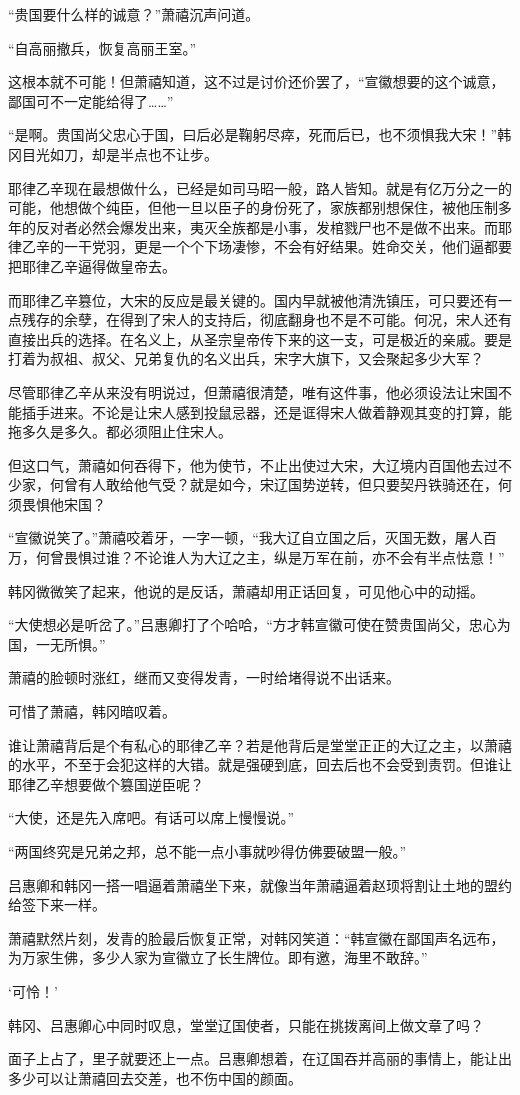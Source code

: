 “贵国要什么样的诚意？”萧禧沉声问道。

“自高丽撤兵，恢复高丽王室。”

这根本就不可能！但萧禧知道，这不过是讨价还价罢了，“宣徽想要的这个诚意，鄙国可不一定能给得了……”

“是啊。贵国尚父忠心于国，曰后必是鞠躬尽瘁，死而后已，也不须惧我大宋！”韩冈目光如刀，却是半点也不让步。

耶律乙辛现在最想做什么，已经是如司马昭一般，路人皆知。就是有亿万分之一的可能，他想做个纯臣，但他一旦以臣子的身份死了，家族都别想保住，被他压制多年的反对者必然会爆发出来，夷灭全族都是小事，发棺戮尸也不是做不出来。而耶律乙辛的一干党羽，更是一个个下场凄惨，不会有好结果。姓命交关，他们逼都要把耶律乙辛逼得做皇帝去。

而耶律乙辛篡位，大宋的反应是最关键的。国内早就被他清洗镇压，可只要还有一点残存的余孽，在得到了宋人的支持后，彻底翻身也不是不可能。何况，宋人还有直接出兵的选择。在名义上，从圣宗皇帝传下来的这一支，可是极近的亲戚。要是打着为叔祖、叔父、兄弟复仇的名义出兵，宋字大旗下，又会聚起多少大军？

尽管耶律乙辛从来没有明说过，但萧禧很清楚，唯有这件事，他必须设法让宋国不能插手进来。不论是让宋人感到投鼠忌器，还是诓得宋人做着静观其变的打算，能拖多久是多久。都必须阻止住宋人。

但这口气，萧禧如何吞得下，他为使节，不止出使过大宋，大辽境内百国他去过不少家，何曾有人敢给他气受？就是如今，宋辽国势逆转，但只要契丹铁骑还在，何须畏惧他宋国？

“宣徽说笑了。”萧禧咬着牙，一字一顿，“我大辽自立国之后，灭国无数，屠人百万，何曾畏惧过谁？不论谁人为大辽之主，纵是万军在前，亦不会有半点怯意！”

韩冈微微笑了起来，他说的是反话，萧禧却用正话回复，可见他心中的动摇。

“大使想必是听岔了。”吕惠卿打了个哈哈，“方才韩宣徽可使在赞贵国尚父，忠心为国，一无所惧。”

萧禧的脸顿时涨红，继而又变得发青，一时给堵得说不出话来。

可惜了萧禧，韩冈暗叹着。

谁让萧禧背后是个有私心的耶律乙辛？若是他背后是堂堂正正的大辽之主，以萧禧的水平，不至于会犯这样的大错。就是强硬到底，回去后也不会受到责罚。但谁让耶律乙辛想要做个篡国逆臣呢？

“大使，还是先入席吧。有话可以席上慢慢说。”

“两国终究是兄弟之邦，总不能一点小事就吵得仿佛要破盟一般。”

吕惠卿和韩冈一搭一唱逼着萧禧坐下来，就像当年萧禧逼着赵顼将割让土地的盟约给签下来一样。

萧禧默然片刻，发青的脸最后恢复正常，对韩冈笑道：“韩宣徽在鄙国声名远布，为万家生佛，多少人家为宣徽立了长生牌位。即有邀，海里不敢辞。”

‘可怜！’

韩冈、吕惠卿心中同时叹息，堂堂辽国使者，只能在挑拨离间上做文章了吗？

面子上占了，里子就要还上一点。吕惠卿想着，在辽国吞并高丽的事情上，能让出多少可以让萧禧回去交差，也不伤中国的颜面。

